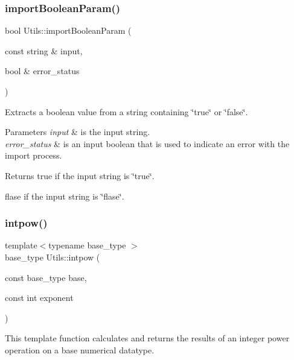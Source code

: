 \subsubsection{\texorpdfstring{import\+Boolean\+Param()}{importBooleanParam()}}
{\footnotesize\ttfamily bool Utils\+::import\+Boolean\+Param (\begin{DoxyParamCaption}\item[{const string \&}]{input,  }\item[{bool \&}]{error\+\_\+status }\end{DoxyParamCaption})}



Extracts a boolean value from a string containing \char`\"{}true\char`\"{} or \char`\"{}false\char`\"{}. 


\begin{DoxyParams}{Parameters}
{\em input} & is the input string. \\
\hline
{\em error\+\_\+status} & is an input boolean that is used to indicate an error with the import process. \\
\hline
\end{DoxyParams}
\begin{DoxyReturn}{Returns}
true if the input string is \char`\"{}true\char`\"{}. 

flase if the input string is \char`\"{}flase\char`\"{}. 
\end{DoxyReturn}
\mbox{\label{namespace_utils_affd19edaa58a3f8425e1f7b4c9233f8a}} 
\subsubsection{\texorpdfstring{intpow()}{intpow()}}
{\footnotesize\ttfamily template$<$typename base\+\_\+type $>$ \\
base\+\_\+type Utils\+::intpow (\begin{DoxyParamCaption}\item[{const base\+\_\+type}]{base,  }\item[{const int}]{exponent }\end{DoxyParamCaption})}



This template function calculates and returns the results of an integer power operation on a base numerical datatype. 


